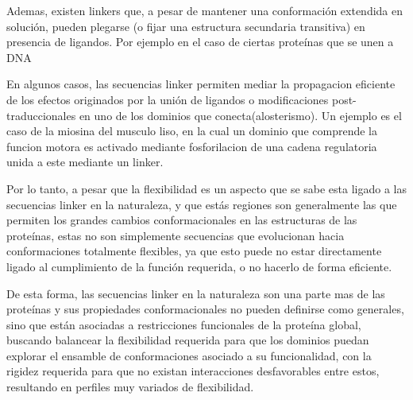 Ademas, existen linkers que, a pesar de mantener una conformación extendida en solución, pueden plegarse (o fijar una estructura secundaria transitiva) en presencia de ligandos.
Por ejemplo en el caso de ciertas proteínas que se unen a DNA\cite{laity2000dna}


En algunos casos, las secuencias linker permiten mediar la propagacion eficiente de los efectos originados por la unión de ligandos o modificaciones post-traduccionales en uno de los dominios que conecta(alosterismo).
Un ejemplo es el caso de la miosina del musculo liso, en la cual un dominio que comprende la funcion motora es activado mediante fosforilacion  de una cadena regulatoria unida a este mediante un linker\cite{ikebe1998hinge}.






Por lo tanto, a pesar que la flexibilidad es un aspecto que se sabe esta ligado a las secuencias linker en la naturaleza\cite{wriggers2005control}, 
y que estás regiones son generalmente las que permiten los grandes cambios conformacionales en las estructuras de las proteínas, 
estas no son simplemente secuencias que evolucionan hacia conformaciones totalmente flexibles, ya que esto puede no estar directamente ligado al cumplimiento de la función requerida, o no hacerlo de forma eficiente.

De esta forma, las secuencias linker en la naturaleza son una parte mas de las proteínas y sus propiedades conformacionales no pueden definirse como generales, sino que están 
asociadas a restricciones funcionales de la proteína global, buscando balancear la flexibilidad requerida 
para que los dominios puedan explorar el ensamble de conformaciones asociado a su funcionalidad, con la rigidez requerida para que no existan interacciones desfavorables entre estos, 
resultando en perfiles muy variados de flexibilidad.

